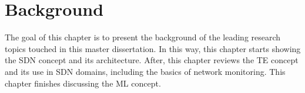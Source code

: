 \chapter{Background}
\label{sec:background} 
The goal of this chapter is to present the background of the leading research topics touched in this master dissertation. In this way, this chapter starts showing the SDN concept and its architecture. After, this chapter reviews the TE concept and its use in SDN domains, including the basics of network monitoring. This chapter finishes discussing the ML concept. %



